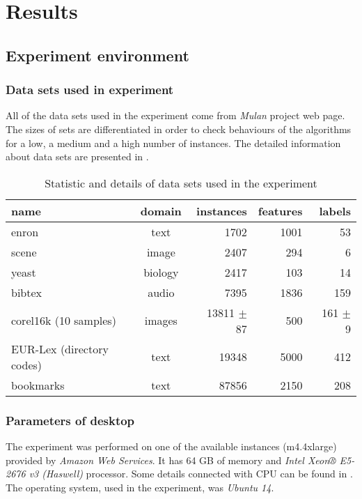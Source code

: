 
\chapter{Results}

\section{Experiment environment}
\subsection{Data sets used in experiment}

All of the data sets used in the experiment come from \textit{Mulan} project web page. The sizes of sets are differentiated in order to check behaviours of the algorithms for a low, a medium and a high number of instances. The detailed information about data sets are presented in . 

\begin{table}[h]
\centering
\caption{Statistic and details of data sets used in the experiment}
\label{tab:exp1}
    \begin{tabular}{l|c|r|r|r}
    name & domain & instances & features & labels \\ \hline \hline
    enron & text  &  1702  & 1001 &  53 \\
    scene & image &  2407  & 294 & 6 \\   
    yeast & biology & 2417 & 103 & 14 \\
    bibtex & audio & 7395 & 1836 & 159 \\
    corel16k (10 samples) & images & 13811 $\pm$ 87 & 500 & 161 $\pm$ 9\\
    EUR-Lex (directory codes) & text & 19348 & 5000 & 412 \\
    bookmarks & text & 87856 & 2150 & 208
    \end{tabular}
\end{table}

\subsection{Parameters of desktop}

The experiment was performed on one of the available instances (m4.4xlarge) provided by \textit{Amazon Web Services}. It has 64 GB of memory and \textit{Intel Xeon® E5-2676 v3 (Haswell)} processor. Some details connected with CPU can be found in . The operating system, used in the experiment, was \textit{Ubuntu 14}.


